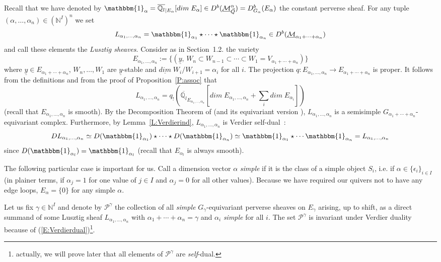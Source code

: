 \documentclass[a4paper,10pt]{amsart}
\def\N{\mathbb{N}}
\def\a{\alpha}
\def\qlb{\overline{\mathbb{Q}_l}}
\def\Ma{\underline{\mathcal{M}}^{\alpha}_{\vec{Q}}}
\numberwithin{equation}{section}
\begin{document}
Recall that we have denoted by $\mathbbm{1}_{\alpha}=\qlb_{|E_{\a}}[dim\;E_{\a}] \in D^b(\Ma) = D^b_{G_{\a}} (E_{\a})$ the constant perverse sheaf. For any tuple $(\a, \ldots, \a_n) \in (\N^I)^n$ we set
\begin{equation}\label{E:41}
L_{\a_1, \ldots,\a_n}=\mathbbm{1}_{\a_1} \star \cdots \star \mathbbm{1}_{\a_n} \in D^b(\underline{\mathcal{M}}_{ \a_1+ \cdots + \a_n})
\end{equation}
and call these elements the \textit{Lusztig sheaves}. Consider as in Section~1.2. the variety
$$E_{\a_1, \ldots, \a_n}:=\big\{ (\underline{y},\, W_n \subset W_{n-1} \subset \cdots \subset W_1=V_{ \a_1+ \cdots + \a_n})\big\}$$
where $\underline{y} \in E_{\a_1 + \cdots + \a_n}$, $W_n, \ldots, W_1$ are $\underline{y}$-stable and $\underline{dim}\; W_{i}/W_{i+1}=\a_i$ for all $i$. The projection $q: E_{\a_1, \ldots, \a_n} \to E_{\a_1 + \cdots + \a_n}$ is proper. It follows from the definitions and from the proof of Proposition~\ref{P:assoc} that 
$$L_{\a_1, \ldots, \a_n}=q_{!} (\qlb_{E_{\a_1, \ldots, \a_n}}[dim\;E_{\a_1, \ldots, \a_n}+\sum_i dim\;E_{\a_i}])$$
(recall that $E_{\a_1, \ldots, \a_n}$ is smooth). By the Decomposition Theorem of \cite{BBD} (and its equivariant version \cite{Bernstein-Lunts}), $L_{\a_1, \ldots, \a_n}$ is a semisimple $G_{\a_1 + \cdots +\a_n}$-equivariant complex.  Furthermore, by Lemma~\ref{L:Verdierind}, $L_{\a_1, \ldots, \a_n}$ is Verdier self-dual~:
\begin{equation}\label{E:Verdierdual}
D L_{\a_1, \ldots, \a_n} \simeq D(\mathbbm{1}_{\a_1}) \star \cdots \star D(\mathbbm{1}_{\a_n}) \simeq \mathbbm{1}_{\a_1} 
\star \cdots \mathbbm{1}_{\a_n} = L_{\a_1, \ldots, \a_n}
\end{equation}
since $D(\mathbbm{1}_{\a_l})=\mathbbm{1}_{\a_l}$ (recall that $E_{\a_l}$ is always smooth).

\vspace{.1in}

The following particular case is important for us. Call a dimension vector $\a$ \textit{simple} if it is the class of a simple object $S_i$, i.e. if $\a \in \{\epsilon_i\}_{i \in I}$ (in plainer terms, if $\a_j=1$ for one value of $j \in I$ and $\a_j=0$ for all other values). Because we have required our quivers not to have any edge loops, $E_{\a}=\{0\}$ for any simple $\a$. 

\vspace{.1in}

 Let us fix $\gamma \in \N^I$ and denote by $\mathcal{P}^{\gamma}$ the collection of all \textit{simple} $G_{\gamma}$-equivariant perverse sheaves on $E_{\gamma}$ arising, up to shift, as a direct summand of some Lusztig sheaf $L_{\a_1, \ldots, \a_n}$ with $\a_1 + \cdots + \a_n=\gamma$ and
 $\a_i$ \textit{simple} for all $i$. The set $\mathcal{P}^{\gamma}$ is invariant under Verdier duality because of (\ref{E:Verdierdual})\footnote{actually, we will prove later that all elements of $\mathcal{P}^{\gamma}$ are \textit{self}-dual.}.
\end{document}
